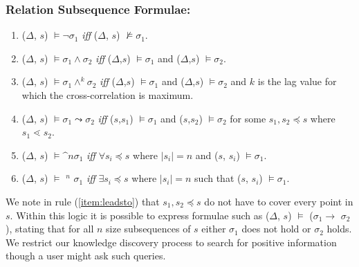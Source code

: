 \subsubsection{Relation Subsequence Formulae:}

\begin{enumerate}


\item ($\Delta$, $s$) $\models \neg  \sigma_1$ {
\em iff } ($\Delta$, $s$) $\not\models \sigma_1$.



\item ($\Delta$, $s$) $\models \sigma_1 \wedge \sigma_2$ { \em iff }
($\Delta$,$s$) 
$\models \sigma_1$ and ($\Delta$,$s$) $\models \sigma_2$.



\item ($\Delta$, $s$) $\models \sigma_1 \wedge^k \sigma_2$ { \em iff }
($\Delta$,$s$) 
$\models \sigma_1$ and ($\Delta$,$s$) $\models \sigma_2$ and $k$ is
the lag value for which the cross-correlation is maximum.


\item\label{item:leadsto} ($\Delta$, $s$) $\models \sigma_1 \leadsto \sigma_2$ { \em iff } ($s$,$s_1$)
$\models \sigma_1$ and ($s$,$s_2$) $\models \sigma_2$ for some $s_1,s_2 \preceq 
s$ where $s_1 \lessdot s_2$.




\item\label{item:fixed} ($\Delta$, $s$) $\models \bm^n \sigma_1$ { \em
iff }
$\forall s_i \preceq  s$ where $\mid s_i \mid = n$ and ($s$, $s_i$) $\models \sigma_1$.




\item\label{item:guarantee} ($\Delta$, $s$) $\models$ \diam$^n$
$\sigma_1$ { \em iff }
$\exists s_i \preceq s$ where $\mid s_i \mid = n$ such that ($s$,
$s_i$) $\models \sigma_1$.

\end{enumerate}

We note in rule (\ref{item:leadsto}) that $s_1,s_2 \preceq 
s$ do not have to cover every point in $s$.
Within this logic it is possible to express formulae such as
($\Delta$, $s$) $\models$  ($\sigma_1
\to$ $\sigma_2$), stating that for all $n$ size subsequences of $s$
either $\sigma_1$ does not hold or $\sigma_2$ holds.
We restrict our knowledge discovery process to
search for positive information though a user might ask such queries.


